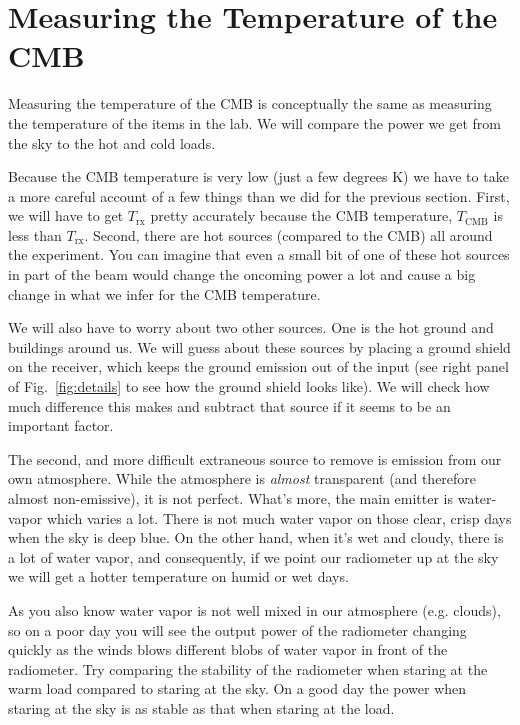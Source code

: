 \section{Measuring the Temperature of the CMB}

Measuring the temperature of the CMB is conceptually the same as  measuring the temperature of the items in the lab. We will compare the power we get from the sky to the hot and cold loads.

Because the CMB temperature is very low (just a few degrees K) we have to take a more careful account of a few things than we did for the previous section. First, we will have to get $T_\textrm{rx}$ pretty accurately because the CMB temperature, $T_\textrm{CMB}$ is less than $T_\textrm{rx}$. Second, there are hot sources (compared to the CMB) all around the experiment. You can imagine that even a small bit of one of these hot sources in part of the beam would change the oncoming power a lot and cause a big change in what we infer for the CMB temperature. 

We will also have to worry about two other sources.
One is the hot ground and buildings around us. We will guess about these sources by placing a ground shield on the receiver, which keeps the ground emission out of the input (see right panel of Fig.~\ref{fig:details} to see how the ground shield looks like). We will check how much difference this makes and subtract that source if it seems to be an important factor.

The second, and more difficult extraneous source to remove is emission from our own atmosphere. While the atmosphere is \textit{almost} transparent (and therefore almost non-emissive), it is not perfect. What's more, the main emitter is water-vapor which varies a lot. There is not much water vapor on those clear, crisp days when the sky is deep blue. On the other hand, when it's wet and cloudy, there is a lot of water vapor, and consequently, if we point our radiometer up at the sky we will get a hotter temperature on humid or wet days.  

As you also know water vapor is not well mixed in our atmosphere (e.g. clouds), so on a poor day you will see the output power of the radiometer changing quickly as the winds blows different blobs of water vapor in front of the radiometer.  Try comparing the stability of the radiometer when staring at the warm load compared to staring at the sky. On a good day the power when staring at the sky is as stable as that when staring at the load.

